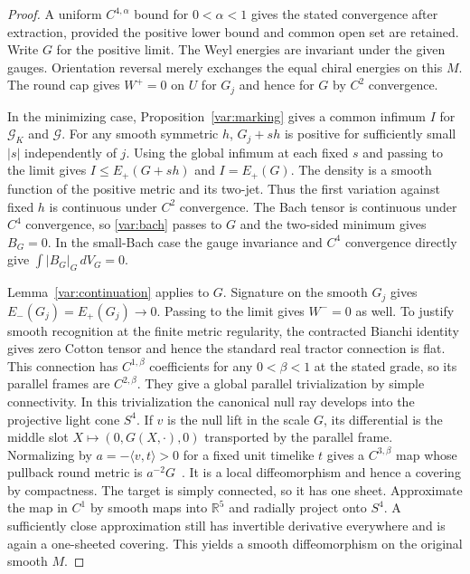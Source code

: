 \documentclass[11pt]{article}
\numberwithin{equation}{section}
\theoremstyle{definition}
\theoremstyle{remark}
\begin{document}
\begin{proof}
A uniform \(C^{4,\alpha}\) bound for \(0<\alpha<1\) gives the
stated convergence after extraction, provided the positive
lower bound and common open set are retained. Write \(G\) for
the positive limit. The Weyl energies are invariant under the
given gauges. Orientation reversal merely exchanges the equal
chiral energies on this \(M\). The round cap gives \(W^+=0\) on
\(U\) for \(G_j\) and hence for \(G\) by \(C^2\) convergence.

In the minimizing case, Proposition~\ref{var:marking} gives a
common infimum \(I\) for \(\mathcal G_K\) and \(\mathcal G\).
For any smooth symmetric \(h\), \(G_j+sh\) is positive for
sufficiently small \(|s|\) independently of \(j\). Using the
global infimum at each fixed \(s\) and passing to the limit gives
\(I\le E_+(G+sh)\) and \(I=E_+(G)\). The density is a smooth
function of the positive metric and its two-jet. Thus the
first variation against fixed \(h\) is continuous under \(C^2\)
convergence. The Bach tensor is continuous under \(C^4\)
convergence, so \eqref{var:bach} passes to \(G\) and the two-sided
minimum gives \(B_G=0\). In the small-Bach case the gauge invariance
and \(C^4\) convergence directly give \(\int |B_G|_G\,dV_G=0\).

Lemma~\ref{var:continuation} applies to \(G\). Signature on the
smooth \(G_j\) gives \(E_-(G_j)=E_+(G_j)\to0\). Passing to the limit
gives \(W^-=0\) as well. To justify smooth recognition at the
finite metric regularity, the contracted Bianchi identity gives
zero Cotton tensor and hence the standard real tractor
connection is flat. This connection has \(C^{1,\beta}\)
coefficients for any \(0<\beta<1\) at the stated grade, so its
parallel frames are \(C^{2,\beta}\). They give a global
parallel trivialization by simple connectivity. In this
trivialization the canonical null ray develops into the
projective light cone \(S^4\). If \(v\) is the null lift in
the scale \(G\), its differential is the middle slot
\(X\mapsto(0,G(X,\cdot),0)\) transported by the parallel frame.
Normalizing by \(a=-\langle v,t\rangle>0\) for a fixed unit
timelike \(t\) gives a \(C^{3,\beta}\) map whose pullback round
metric is \(a^{-2}G\)~\cite[\S3.1, (10) and (13)]{GoverSilhan2009HigherSymmetries}.
It is a local diffeomorphism and hence a covering by compactness.
The target is simply connected, so it has one sheet. Approximate
the map in \(C^1\) by smooth maps into \(\mathbb R^5\) and
radially project onto \(S^4\). A sufficiently close approximation
still has invertible derivative everywhere and is again a
one-sheeted covering. This yields a smooth diffeomorphism on the
original smooth \(M\).
\end{proof}
\end{document}
